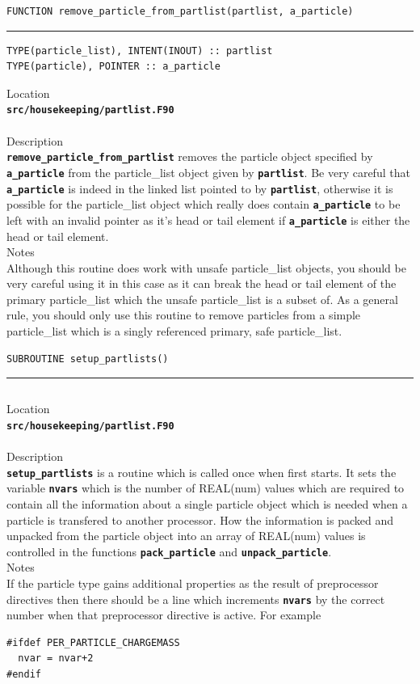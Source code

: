 \documentclass[12pt,a4paper]{article}
\newcommand{\HRule}{\rule{\linewidth}{0.5mm}}
\newcommand{\simpleboxverbatim}{\begin{Verbatim}[obeytabs=true,frame=single,
  framerule=0.5mm,rulecolor=\color{warwickmid},formatcom=\color{black}]}
\newcommand{\inlinecode}[1]{{\color{warwickred} \bf\texttt{#1}}}
\newcommand{\EPOCH}{{\color{warwickdark}\fontfamily{phv}\selectfont{EPOCH}}}
\newcommand{\codedef}{\begin{Verbatim}[formatcom=\color{warwickred},fontsize=\Large,hfuzz=0pt]}
\newcommand{\coderule}{
{\color{warwickred}\vspace{-0.5cm}\HRule}
\codedef}
\begin{document}
\pagebreak
\codedef
FUNCTION remove_particle_from_partlist(partlist, a_particle)
\end{Verbatim}
\coderule
TYPE(particle_list), INTENT(INOUT) :: partlist
TYPE(particle), POINTER :: a_particle
\end{Verbatim}
\vspace{1cm}
{\Large Location\\}
\inlinecode{src/housekeeping/partlist.F90}\\
\\[0.5cm]
{\Large Description\\}
\inlinecode{remove\_particle\_from\_partlist} removes the particle object
specified by \inlinecode{a\_particle} from the particle\_list object given by
\inlinecode{partlist}. Be very careful that \inlinecode{a\_particle} is indeed in
the linked list pointed to by \inlinecode{partlist}, otherwise it is possible
for the particle\_list object which really does contain \inlinecode{a\_particle}
to be left with an invalid pointer as it's head or tail element if
\inlinecode{a\_particle} is either the head or tail element.
\\[0.5cm]
{\Large Notes\\}
Although this routine does work with unsafe particle\_list objects, you should be
very careful using it in this case as it can break the head or tail element of
the primary particle\_list which the unsafe particle\_list is a subset of. As a
general rule, you should only use this routine to remove particles from a
simple particle\_list which is a singly referenced primary, safe particle\_list.

\pagebreak
\codedef
SUBROUTINE setup_partlists()
\end{Verbatim}
\coderule

\end{Verbatim}
\vspace{1cm}
{\Large Location\\}
\inlinecode{src/housekeeping/partlist.F90}\\
\\[0.5cm]
{\Large Description\\}
\inlinecode{setup\_partlists} is a routine which is called once when {\EPOCH}
first starts. It sets the variable \inlinecode{nvars} which is the number of
REAL(num) values which are required to contain all the information about a
single particle object which is needed when a particle is transfered to another
processor. How the information is packed and unpacked from the particle object
into an array of REAL(num) values is controlled in the functions
\inlinecode{pack\_particle} and \inlinecode{unpack\_particle}.
\\[0.5cm]
{\Large Notes\\}
If the particle type gains additional properties as the result of preprocessor
directives then there should be a line which increments \inlinecode{nvars} by
the correct number when that preprocessor directive is active. For example
\simpleboxverbatim
#ifdef PER_PARTICLE_CHARGEMASS
  nvar = nvar+2
#endif
\end{Verbatim}
\end{document}
